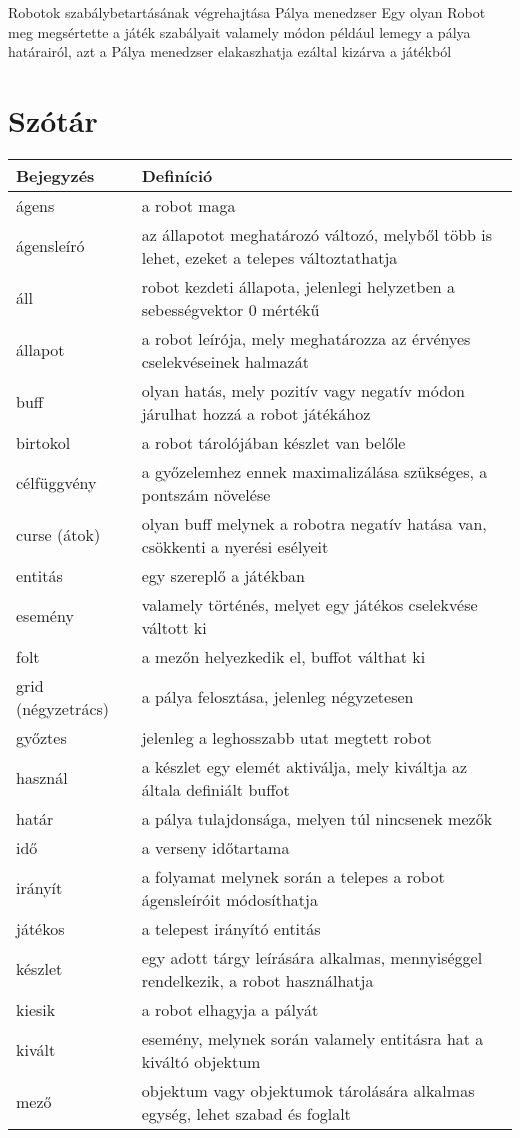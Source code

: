 %
{Robotok szabálybetartásának végrehajtása}%
{Pálya menedzser}%
{Egy olyan Robot meg megsértette a játék szabályait valamely módon például lemegy a pálya határairól, azt a Pálya menedzser elakaszhatja ezáltal kizárva a játékból}

\section{Szótár}

\begin{tabularx}{\textwidth}{| l | l |}
\hline
\textbf{Bejegyzés} & \textbf{Definíció} \tabularnewline 
\hline\hline
    ágens & a robot maga \tabularnewline \hline
    ágensleíró &  az állapotot meghatározó változó, melyből több is lehet, ezeket a telepes változtathatja \tabularnewline \hline
    áll &  robot kezdeti állapota, jelenlegi helyzetben a sebességvektor 0 mértékű \tabularnewline \hline
    állapot &  a robot leírója, mely meghatározza az érvényes cselekvéseinek halmazát \tabularnewline \hline
    buff &  olyan hatás, mely pozitív vagy negatív módon járulhat hozzá a robot játékához \tabularnewline \hline
    birtokol & a robot tárolójában készlet van belőle \tabularnewline \hline
    célfüggvény & a győzelemhez ennek maximalizálása szükséges, a pontszám növelése  \tabularnewline \hline
    curse (átok) & olyan buff melynek a robotra negatív hatása van, csökkenti a nyerési esélyeit \tabularnewline \hline
    entitás &  egy szereplő a játékban \tabularnewline \hline 
    esemény & valamely történés, melyet egy játékos cselekvése váltott ki \tabularnewline \hline
    folt &  a mezőn helyezkedik el, buffot válthat ki \tabularnewline \hline
    grid (négyzetrács) & a pálya felosztása, jelenleg négyzetesen \tabularnewline \hline
    győztes &  jelenleg a leghosszabb utat megtett robot \tabularnewline \hline
    használ &  a készlet egy elemét aktiválja, mely kiváltja az általa definiált buffot \tabularnewline \hline
    határ &  a pálya tulajdonsága, melyen túl nincsenek mezők \tabularnewline \hline
    idő &  a verseny időtartama \tabularnewline \hline
    irányít &  a folyamat melynek során a telepes a robot ágensleíróit módosíthatja \tabularnewline \hline
    játékos &  a telepest irányító entitás \tabularnewline \hline
    készlet &  egy adott tárgy leírására alkalmas, mennyiséggel rendelkezik, a robot használhatja \tabularnewline \hline
    kiesik &  a robot elhagyja a pályát \tabularnewline \hline
    kivált &  esemény, melynek során valamely entitásra hat a kiváltó objektum \tabularnewline \hline
    mező &  objektum vagy objektumok tárolására alkalmas egység, lehet szabad és foglalt \tabularnewline \hline

\end{tabularx}
